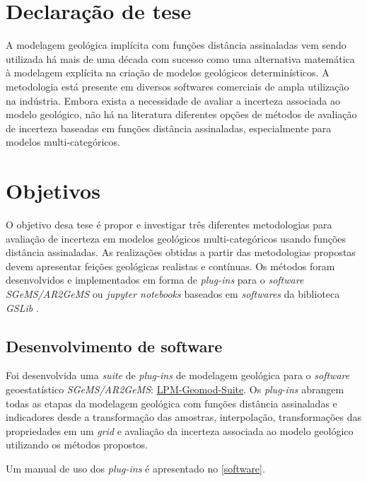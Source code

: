 \section{Declaração de tese}

\begin{tcolorbox}
A modelagem geológica implícita com funções distância assinaladas vem sendo utilizada há mais de uma década com sucesso como uma alternativa matemática à modelagem explícita na criação de modelos geológicos determinísticos. A metodologia está presente em diversos softwares comerciais de ampla utilização na indústria. Embora exista a necessidade de avaliar a incerteza associada ao modelo geológico, não há na literatura diferentes opções de métodos de avaliação de incerteza baseadas em funções distância assinaladas, especialmente para modelos multi-categóricos.
\end{tcolorbox}

\section{Objetivos}

O objetivo desa tese é propor e investigar três diferentes metodologias para avaliação de incerteza em modelos geológicos   multi-categóricos usando funções distância assinaladas. As realizações obtidas a partir das metodologias propostas devem apresentar feições geológicas realistas e contínuas. Os métodos foram desenvolvidos e implementados em forma de \textit{plug-ins} para o \textit{software SGeMS/AR2GeMS} \cite{remy2009applied} ou \textit{jupyter notebooks} baseados em \textit{softwares} da biblioteca \textit{GSLib} \cite{deutsch1992geostatistical}.

\subsection{Desenvolvimento de software}

Foi desenvolvida uma \textit{suite} de \textit{plug-ins} de modelagem geológica para o \textit{software} geoestatístico \textit{SGeMS/AR2GeMS}: \href{https://github.com/robertorolo/LPM-Geomod_Suite}{LPM-Geomod-Suite}. Os \textit{plug-ins} abrangem todas as etapas da modelagem geológica com funções distância assinaladas e indicadores desde a transformação das amostras, interpolação, transformações das propriedades em um \textit{grid} e avaliação da incerteza associada ao modelo geológico utilizando os métodos propostos. 

Um manual de uso dos \textit{plug-ins} é apresentado no \autoref{software}. 


